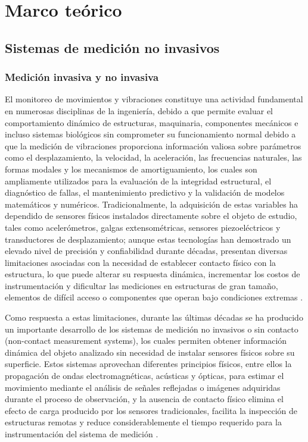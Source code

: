 ﻿\chapter{Marco teórico}
\glsresetall
\label{cap:MarcoTeorico}

\section{Sistemas de medición no invasivos}
    \subsection{Medición invasiva y no invasiva}
    
El monitoreo de movimientos y vibraciones constituye una actividad fundamental en numerosas disciplinas de la ingeniería, debido a que permite evaluar el comportamiento dinámico de estructuras, maquinaria, componentes mecánicos e incluso sistemas biológicos sin comprometer su funcionamiento normal debido a que la medición de vibraciones proporciona información valiosa sobre parámetros como el desplazamiento, la velocidad, la aceleración, las frecuencias naturales, las formas modales y los mecanismos de amortiguamiento, los cuales son ampliamente utilizados para la evaluación de la integridad estructural, el diagnóstico de fallas, el mantenimiento predictivo y la validación de modelos matemáticos y numéricos. Tradicionalmente, la adquisición de estas variables ha dependido de sensores físicos instalados directamente sobre el objeto de estudio, tales como acelerómetros, galgas extensométricas, sensores piezoeléctricos y transductores de desplazamiento; aunque estas tecnologías han demostrado un elevado nivel de precisión y confiabilidad durante décadas, presentan diversas limitaciones asociadas con la necesidad de establecer contacto físico con la estructura, lo que puede alterar su respuesta dinámica, incrementar los costos de instrumentación y dificultar las mediciones en estructuras de gran tamaño, elementos de difícil acceso o componentes que operan bajo condiciones extremas \cite{castellini2006laser}.

Como respuesta a estas limitaciones, durante las últimas décadas se ha producido un importante desarrollo de los sistemas de medición no invasivos o sin contacto (non-contact measurement systems), los cuales permiten obtener información dinámica del objeto analizado sin necesidad de instalar sensores físicos sobre su superficie. Estos sistemas aprovechan diferentes principios físicos, entre ellos la propagación de ondas electromagnéticas, acústicas y ópticas, para estimar el movimiento mediante el análisis de señales reflejadas o imágenes adquiridas durante el proceso de observación, y  la ausencia de contacto físico elimina el efecto de carga producido por los sensores tradicionales, facilita la inspección de estructuras remotas y reduce considerablemente el tiempo requerido para la instrumentación del sistema de medición \cite{cheng2025vision}.

